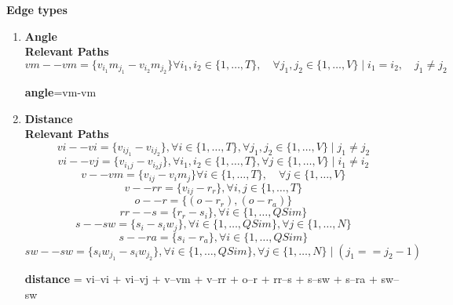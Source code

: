 \documentclass{report} %
\begin{document}

\textbf{Edge types}

\begin{enumerate}
    \item \textbf{Angle} \\
    \textbf{Relevant Paths}
    \[
    vm--vm = \{ v_{i_{1}}m_{j_{1}} - v_{i_{2}}m_{j_{2}} \}
    \forall i_1, i_2 \in \{1, \dots, T\}, \quad \forall j_1, j_2 \in \{1, \dots, V\} \mid
    i_1 = i_2, \quad j_1 \neq j_2
    \]

    \textbf{angle}=vm-vm

    \item \textbf{Distance} \\
    \textbf{Relevant Paths}
    \[
        vi--vi = \{v_{i j_1} - v_{i j_2}\}, \forall i \in \{1, \dots, T\}, \forall j_1, j_2 \in \{1, \dots, V\} \mid  j_1 \neq j_2
    \]
    \[
        vi--vj = \{v_{i_1 j} - v_{i_2 j}\}, \forall i_1, i_2 \in \{1, \dots, T\}, \forall j \in \{1, \dots, V\} \mid  i_1 \neq i_2
    \]
    \[
        v--vm = \{v_{i j} - v_{i}m_{j}\} \forall i  \in \{1, \dots, T\}, \quad \forall j \in \{1, \dots, V\}
    \]
    \[
        v--rr = \{v_{i j} - r_{r}\}, \forall i, j  \in \{1, \dots, T\}
    \]
    \[
        o--r = \{ (o - r_{r}), (o - r_{a})\}
    \]
    \[
        rr--s = \{r_{r} - s_{i}\}, \forall i  \in \{1, \dots, QSim\}
    \]
    \[
        s--sw = \{s_{i} - s_{i}w_{j}\}, \forall i  \in \{1, \dots, QSim\}, \forall j  \in \{1, \dots, N\}
    \]
    \[
        s--ra = \{s_{i} - r_{a}\}, \forall i  \in \{1, \dots, QSim\}
    \]
    \[
        sw--sw = \{s_{i}w_{j_1} - s_{i}w_{j_2}\}, \forall i  \in \{1, \dots, QSim\}, \forall j  \in \{1, \dots, N\} \mid (j_1 == j_2-1)
    \]

    \textbf{distance} = vi--vi + vi--vj + v--vm + v--rr + o--r + rr--s + s--sw + s--ra + sw--sw

\end{enumerate}
\end{document}
